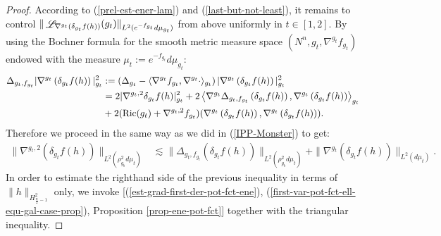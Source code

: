 \documentclass[a4paper,11pt,reqno]{amsart}
\def\Ric{\mathop{\rm Ric}\nolimits}
\def\Li{\mathop{\rm \mathscr{L}}\nolimits}
\def\Ric{\mathop{\rm Ric}\nolimits}
\def\Li{\mathop{\rm \mathscr{L}}\nolimits}
\numberwithin{equation}{section}
\begin{document}
\begin{proof}
		According to (\ref{prel-est-ener-lam}) and (\ref{last-but-not-least}), it remains to control $\|\Li_{\nabla^{g_t}(\delta_{g_t}f(h))}(g_t)\|_{L^2(e^{-f_{g_t}}d\mu_{g_t})}$ from above uniformly in $t\in[1,2]$. By using the Bochner formula for the smooth metric measure space $\left(N^n,g_t,\nabla^{g_t}f_{g_t}\right)$ endowed with the measure $\mu_t:=e^{-f_{g_t}}d\mu_{g_t}$: 
		\begin{equation*}
		\begin{split}
		\Delta_{g_t,f_{g_t}}|\nabla^{g_t} \left(\delta_{g_t}f(h)\right)|_{g_t}^2&:=\left(\Delta_{g_t}-\langle\nabla^{g_t}f_{g_t},\nabla^{g_t}\cdot\rangle_{g_t}\right)|\nabla^{g_t} \left(\delta_{g_t}f(h)\right)|_{g_t}^2\\
		&=2|\nabla^{g_t,2}\delta_{g_t}f(h)|^2_{g_t}+2\left\langle\nabla^{g_t}\Delta_{g_t,f_{g_t}}\left(\delta_{g_t}f(h)\right),\nabla^{g_t}\left(\delta_{g_t}f(h)\right)\right\rangle_{g_t}\\
		&+2(\Ric(g_t)+\nabla^{g_t,2}f_{g_t})(\nabla^{g_t}\left(\delta_{g_t}f(h)\right),\nabla^{g_t}\left(\delta_{g_t}f(h)\right)).
		\end{split}
		\end{equation*}
		Therefore we proceed in the same way as we did in (\ref{IPP-Monster}) to get:
		\begin{equation}
		\begin{split}\label{est-hess-first-var-pot-fct-ene}
		\|\nabla^{g_t,2}\left(\delta_{g_t}f(h)\right)\|_{L^2(\rho_{g_b}^2d\mu_{t})}&\lesssim\|\Delta_{g_t,f_{g_t}}\left(\delta_{g_t}f(h)\right)\|_{L^2(\rho_{g_b}^2d\mu_{t})}+\|\nabla^{g_t}\left(\delta_{g_t}f(h)\right)\|_{L^2(d\mu_{t})}.
		\end{split}
		\end{equation}
		In order to estimate the righthand side of the previous inequality in terms of $\|h\|_{H^2_{\frac{n}{2}-1}}$ only, we invoke [(\ref{est-grad-first-der-pot-fct-ene}), (\ref{first-var-pot-fct-ell-equ-gal-case-prop}), Proposition \ref{prop-ene-pot-fct}] together with the triangular inequality.
		

\end{proof}
\end{document}
